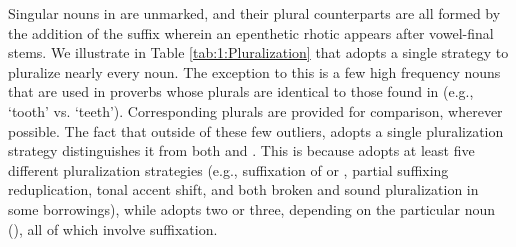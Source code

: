 \documentclass[output=paper]{../langsci/langscibook}
\begin{document}
 Singular nouns in  are unmarked, and their plural counterparts are all formed by the addition of the suffix  wherein an epenthetic rhotic appears after vowel-final stems. We illustrate in Table \ref{tab:1:Pluralization} that  adopts a single strategy to pluralize nearly every noun. The exception to this is a few high frequency nouns that are used in proverbs whose plurals are identical to those found in  (e.g.,  `tooth' vs.  `teeth'). Corresponding  plurals are provided for comparison, wherever possible. The fact that outside of these few outliers,  adopts a single pluralization strategy distinguishes it from both  and . This is because  adopts at least five different pluralization strategies (e.g., suffixation of  or , partial suffixing reduplication, tonal accent shift, and both broken and sound pluralization in some  borrowings), while  adopts two or three, depending on the particular noun (\citealt{Paster2010}), all of which involve suffixation.
 \begin{table}
 	\caption{\textit{Pluralization}}
 	\label{tab:1:Pluralization}
 \end{table}
 
\end{document}
